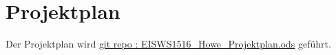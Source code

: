 \chapter{Projektplan}

\begin{comment}
Ein Projektplan wird innerhalb der Projektlaufzeit laufend fortgeführt. Sämtliche Projektaktivitäten werden chronologisch aufgelistet und in Unteraktivitäten gegliedert (mind. drei Gliederungsebenen). Dabei soll zu den Aktivitäten die geplante Zeit gegenüber der tatsächlich verbrauchten Zeit in Stunden angegeben werden. Zudem sollte eine Zuweisung zu den Teammitgliedern erfolgen.
\end{comment}

Der Projektplan wird \href{https://github.com/thuascgn/EISWS1516Howe/blob/master/EISWS1516_Howe_Projektplan.ods}{git repo : EISWS1516_Howe_Projektplan.ods} geführt.